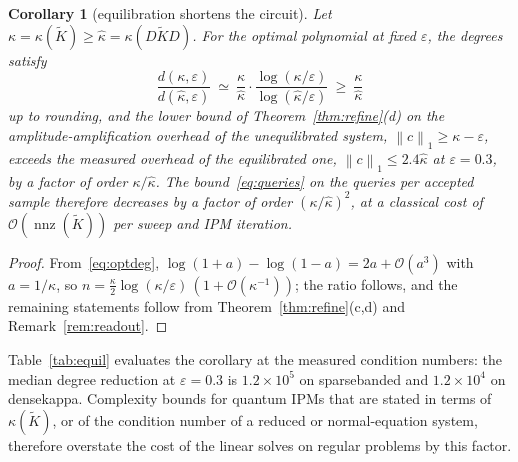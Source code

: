 \documentclass[11pt]{article}
\newtheorem{corollary}[theorem]{Corollary}
\theoremstyle{definition}
\newcommand{\norm}[1]{\left\lVert #1 \right\rVert}
\newcommand{\Kt}{\tilde K}
\newcommand{\kh}{\hat\kappa}
\newcommand{\eps}{\varepsilon}
\newcommand{\bigO}{\mathcal{O}}
\newcommand{\nnz}{\operatorname{nnz}}
\newcommand{\dsus}{\textunderscore\penalty5000\hskip0pt\relax}
\newcommand{\ds}[1]{{\ttfamily\let\_\dsus#1}}
\begin{document}
\begin{corollary}[equilibration shortens the circuit]\label{cor:equil}
Let $\kappa=\kappa(\Kt)\ge\kh=\kappa(D\Kt D)$. For the optimal polynomial at fixed $\eps$, the degrees satisfy
\[
\frac{d(\kappa,\eps)}{d(\kh,\eps)}\ \simeq\ \frac{\kappa}{\kh}\cdot\frac{\log(\kappa/\eps)}{\log(\kh/\eps)}\ \ge\ \frac{\kappa}{\kh}
\]
up to rounding, and the lower bound of Theorem~\ref{thm:refine}(d) on the amplitude-amplification overhead of the unequilibrated system, $\norm{c}_1\ge\kappa-\eps$, exceeds the measured overhead of the equilibrated one, $\norm{c}_1\le2.4\kh$ at $\eps=0.3$, by a factor of order $\kappa/\kh$. The bound~\eqref{eq:queries} on the queries per accepted sample therefore decreases by a factor of order $(\kappa/\kh)^2$, at a classical cost of $\bigO(\nnz(\Kt))$ per sweep and IPM iteration.
\end{corollary}
\begin{proof}
From~\eqref{eq:optdeg}, $\log(1+a)-\log(1-a)=2a+\bigO(a^3)$ with $a=1/\kappa$, so $n=\tfrac{\kappa}{2}\log(\kappa/\eps)\,(1+\bigO(\kappa^{-1}))$; the ratio follows, and the remaining statements follow from Theorem~\ref{thm:refine}(c,d) and Remark~\ref{rem:readout}.
\end{proof}
Table~\ref{tab:equil} evaluates the corollary at the measured condition numbers: the median degree reduction at $\eps=0.3$ is $1.2\times10^{5}$ on \ds{sparse\_banded} and $1.2\times10^{4}$ on \ds{dense\_kappa}. Complexity bounds for quantum IPMs that are stated in terms of $\kappa(\Kt)$, or of the condition number of a reduced or normal-equation system, therefore overstate the cost of the linear solves on regular problems by this factor.
\end{document}
